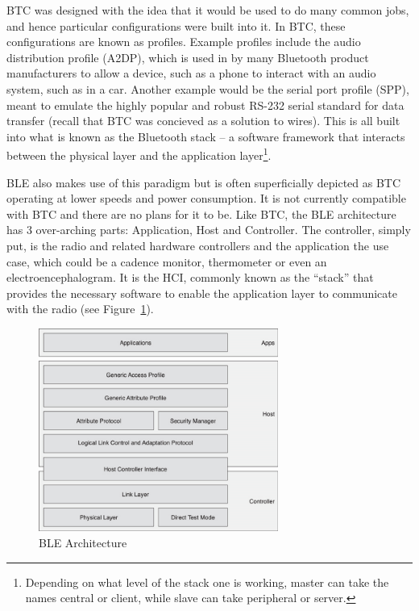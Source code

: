 \documentclass[]{article}
\begin{document}
\ac{BTC} was designed with the idea that it would be used to do many common jobs, and hence particular configurations were built into it. In \ac{BTC}, these configurations are known as profiles. Example profiles include the audio distribution profile (A2DP), which is used in by many Bluetooth product manufacturers to allow a device, such as a phone to interact with an audio system, such as in a car. Another example would be the serial port profile (SPP), meant to emulate the highly popular and robust RS-232 serial standard for data transfer (recall that \ac{BTC} was concieved as a solution to wires). This is all built into what is known as the Bluetooth stack – a software framework that interacts between the physical layer and the application layer\footnote{Depending on what level of the stack one is working, master can take the names central or client, while slave can take peripheral or server.}.  

\ac{BLE} also makes use of this paradigm but is often superficially depicted as \ac{BTC} operating at lower speeds and power consumption. It is not currently compatible with \ac{BTC} and there are no plans for it to be. Like \ac{BTC}, the \ac{BLE} architecture has 3 over-arching parts: Application, Host and Controller. The controller, simply put, is the radio and related hardware controllers and the application the use case, which could be a cadence monitor, thermometer or even an electroencephalogram. It is the \ac{HCI}, commonly known as the “stack” that provides the necessary software to enable the application layer to communicate with the radio (see Figure~\ref{fig:ble_arch}).

\begin{figure}[htb]
	\begin{center}
		\includegraphics[width = 0.7\textwidth]{ble_arch}
	\end{center}
	\caption{\ac{BLE} Architecture}
	\label{fig:ble_arch}
\end{figure}
\end{document}

